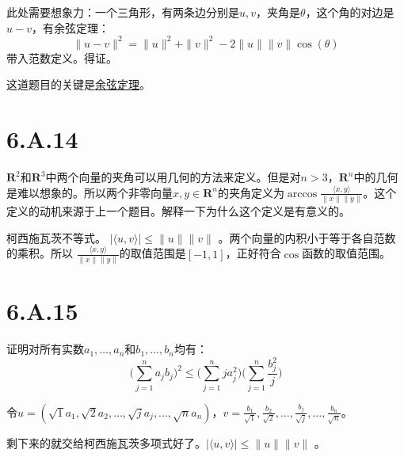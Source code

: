 \documentclass[10pt,a4paper,UTF8]{article}
\begin{document}
\begin{tikzanswer}
此处需要想象力：一个三角形，有两条边分别是\(u,v\)，夹角是\(\theta\)，这个角的对边是\(u-v\)，有余弦定理：
\begin{equation}
\label{eq:17}
\| u-v \|^{2} = \| u \|^{2} + \| v \|^{2} - 2 \| u \| \| v \|\cos(\theta)
\end{equation}
带入范数定义。得证。

这道题目的关键是\href{https://zh.wikipedia.org/wiki/\%25E9\%25A4\%2598\%25E5\%25BC\%25A6\%25E5\%25AE\%259A\%25E7\%2590\%2586}{余弦定理}。
\end{tikzanswer}
\section{6.A.14}
\label{sec:org0de39c7}


\begin{tikzproblem}
\(\mathbf{R}^{2}\)和\(\mathbf{R}^{3}\)中两个向量的夹角可以用几何的方法来定义。但是对\(n > 3\)，\(\mathbf{R}^{n}\)中的几何是难以想象的。所以两个非零向量\(x,y\in \mathbf{R}^{n}\)的夹角定义为\(\arccos \tfrac{\langle x,y \rangle  }{ \| x \| \| y \| }\)。这个定义的动机来源于上一个题目。解释一下为什么这个定义是有意义的。
\end{tikzproblem}

\begin{tikzanswer}
柯西施瓦茨不等式。 \(| \langle u,v \rangle  |  \leq \| u \| \| v \|\) 。两个向量的内积小于等于各自范数的乘积。所以 \(\tfrac{\langle x,y \rangle  }{ \| x \| \| y \| }\)的取值范围是\([-1,1]\)，正好符合\(\cos\)函数的取值范围。
\end{tikzanswer}
\section{6.A.15}
\label{sec:org83aa824}


\begin{tikzproblem}
证明对所有实数\(a_{1},\ldots ,a_{n}\)和\(b_{1},\ldots ,b_{n}\)均有：
\begin{equation}
\label{eq:18}
\bigg( \sum_{j=1}^{n} a_{j}b_{j} \bigg)^{2} \leq \bigg( \sum_{j=1}^{n} ja_{j}^{2} \bigg) \bigg( \sum_{j=1}^{n} \frac{b_{j}^{2}}{j} \bigg)
\end{equation}
\end{tikzproblem}

\begin{tikzanswer}
令\(u = (\sqrt{1}a_{1}, \sqrt{2}a_{2},\ldots ,\sqrt{j}a_{j},\ldots ,\sqrt{n}a_{n})\)，\(v = \frac{b_{1}}{\sqrt{1}} , \frac{b_{2}}{\sqrt{2}},\ldots , \frac{b_{j}}{\sqrt{j}},\ldots ,\frac{b_{n}}{\sqrt{n}}\)。

剩下来的就交给柯西施瓦茨多项式好了。\(| \langle u,v \rangle  | \leq \| u \| \| v \|\) 。
\end{tikzanswer}
\end{document}
